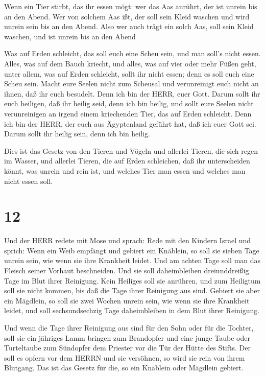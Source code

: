  Wenn ein Tier stirbt, das ihr essen mögt: wer das Aas
anrührt, der ist unrein bis an den Abend.  Wer von solchem
Aas ißt, der soll sein Kleid waschen und wird unrein sein bis an den
Abend. Also wer auch trägt ein solch Aas, soll sein Kleid waschen, und
ist unrein bis an den Abend

 Was auf Erden schleicht, das soll euch eine Scheu sein,
und man soll's nicht essen.  Alles, was auf dem Bauch
kriecht, und alles, was auf vier oder mehr Füßen geht, unter allem, was
auf Erden schleicht, sollt ihr nicht essen; denn es soll euch eine Scheu
sein.  Macht eure Seelen nicht zum Scheusal und
verunreinigt euch nicht an ihnen, daß ihr euch besudelt. 
Denn ich bin der HERR, euer Gott. Darum sollt ihr euch heiligen, daß ihr
heilig seid, denn ich bin heilig, und sollt eure Seelen nicht
verunreinigen an irgend einem kriechenden Tier, das auf Erden schleicht.
 Denn ich bin der HERR, der euch aus Ägyptenland geführt
hat, daß ich euer Gott sei. Darum sollt ihr heilig sein, denn ich bin
heilig.

 Dies ist das Gesetz von den Tieren und Vögeln und allerlei
Tieren, die sich regen im Wasser, und allerlei Tieren, die auf Erden
schleichen,  daß ihr unterscheiden könnt, was unrein und
rein ist, und welches Tier man essen und welches man nicht essen soll.

\hypertarget{section-11}{%
\section{12}\label{section-11}}

 Und der HERR redete mit Mose und sprach:  Rede
mit den Kindern Israel und sprich: Wenn ein Weib empfängt und gebiert
ein Knäblein, so soll sie sieben Tage unrein sein, wie wenn sie ihre
Krankheit leidet.  Und am achten Tage soll man das Fleisch
seiner Vorhaut beschneiden.  Und sie soll daheimbleiben
dreiunddreißig Tage im Blut ihrer Reinigung. Kein Heiliges soll sie
anrühren, und zum Heiligtum soll sie nicht kommen, bis daß die Tage
ihrer Reinigung aus sind.  Gebiert sie aber ein Mägdlein, so
soll sie zwei Wochen unrein sein, wie wenn sie ihre Krankheit leidet,
und soll sechsundsechzig Tage daheimbleiben in dem Blut ihrer Reinigung.

 Und wenn die Tage ihrer Reinigung aus sind für den Sohn
oder für die Tochter, soll sie ein jähriges Lamm bringen zum Brandopfer
und eine junge Taube oder Turteltaube zum Sündopfer dem Priester vor die
Tür der Hütte des Stifts.  Der soll es opfern vor dem HERRN
und sie versöhnen, so wird sie rein von ihrem Blutgang. Das ist das
Gesetz für die, so ein Knäblein oder Mägdlein gebiert.

